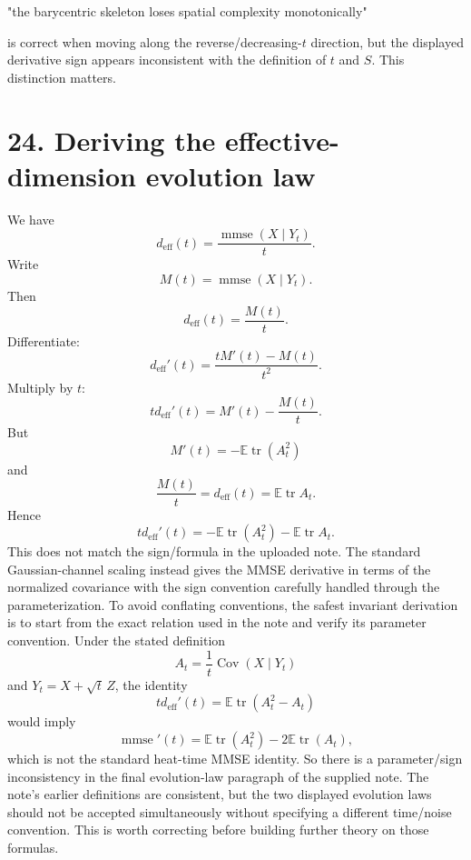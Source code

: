 \documentclass{article}
\begin{document}
"the barycentric skeleton loses spatial complexity monotonically"

is correct when moving along the reverse/decreasing-$t$ direction, but the displayed derivative sign appears inconsistent with the definition of $t$ and $S$.
This distinction matters.

\section*{24. Deriving the effective-dimension evolution law}
We have
\[
d_{\mathrm{eff}}(t) = \frac{\operatorname{mmse}(X\mid Y_t)}{t}.
\]
Write
\[
M(t) = \operatorname{mmse}(X\mid Y_t).
\]
Then
\[
d_{\mathrm{eff}}(t) = \frac{M(t)}{t}.
\]
Differentiate:
\[
d_{\mathrm{eff}}'(t) = \frac{tM'(t)-M(t)}{t^2}.
\]
Multiply by $t$:
\[
t d_{\mathrm{eff}}'(t) = M'(t)-\frac{M(t)}{t}.
\]
But
\[
M'(t) = -\mathbb E\operatorname{tr}(A_t^2)
\]
and
\[
\frac{M(t)}{t} = d_{\mathrm{eff}}(t) = \mathbb E\operatorname{tr}A_t.
\]
Hence
\[
t d_{\mathrm{eff}}'(t) = -\mathbb E\operatorname{tr}(A_t^2) - \mathbb E\operatorname{tr}A_t.
\]
This does not match the sign/formula in the uploaded note.
The standard Gaussian-channel scaling instead gives the MMSE derivative in terms of the normalized covariance with the sign convention carefully handled through the parameterization. To avoid conflating conventions, the safest invariant derivation is to start from the exact relation used in the note and verify its parameter convention.
Under the stated definition
\[
A_t = \frac1t\operatorname{Cov}(X\mid Y_t)
\]
and $Y_t = X + \sqrt{t}\,Z$, the identity
\[
t d_{\mathrm{eff}}'(t) = \mathbb E\operatorname{tr}(A_t^2-A_t)
\]
would imply
\[
\operatorname{mmse}'(t) = \mathbb E\operatorname{tr}(A_t^2) - 2\mathbb E\operatorname{tr}(A_t),
\]
which is not the standard heat-time MMSE identity.
So there is a parameter/sign inconsistency in the final evolution-law paragraph of the supplied note. The note's earlier definitions are consistent, but the two displayed evolution laws should not be accepted simultaneously without specifying a different time/noise convention.
This is worth correcting before building further theory on those formulas.
\end{document}
